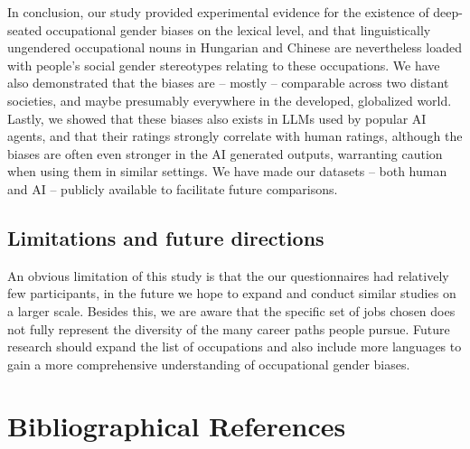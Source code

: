 \documentclass[10pt, a4paper]{article}
\begin{document}
In conclusion, our study provided experimental evidence for the existence of deep-seated occupational gender biases on the lexical level, and that linguistically ungendered occupational nouns in Hungarian and Chinese are nevertheless loaded with people's social gender stereotypes relating to these occupations. We have also demonstrated that the biases are -- mostly -- comparable across two distant societies, and maybe presumably everywhere in the developed, globalized world. Lastly, we showed that these biases also exists in LLMs used by popular AI agents, and that their ratings strongly correlate with human ratings, although the biases are often even stronger in the AI generated outputs, warranting caution when using them in similar settings. We have made our datasets -- both human and AI -- publicly available to facilitate future comparisons.

\subsection{Limitations and future directions}

An obvious limitation of this study is that the our questionnaires had relatively few participants, in the future we hope to expand and conduct similar studies on a larger scale. Besides this, we are aware that the specific set of jobs chosen does not fully represent the diversity of the many career paths people pursue. Future research should expand the list of occupations and also include more languages to gain a more comprehensive understanding of occupational gender biases.



\section{Bibliographical References}\label{sec:reference}




\end{document}
